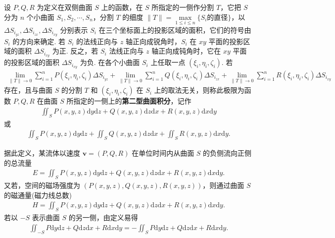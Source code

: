 \documentclass[../../main.tex]{subfiles}%
\begin{document}
\begin{definition}
设 $P, Q, R$ 为定义在双侧曲面 $S$ 上的函数，在 $S$ 所指定的一侧作分割 $T$，它把 $S$ 分为 $n$ 个小曲面 $S_1, S_2, \cdots, S_n$，分割 $T$ 的细度 $\|T\| = \max\limits_{1\leqslant i\leqslant n} \{S_i \text{的直径}\}$，以 $\Delta S_{i_{yz}}, \Delta S_{i_{zx}}, \Delta S_{i_{xy}}$ 分别表示 $S_i$ 在三个坐标面上的投影区域的面积，它们的符号由 $S_i$ 的方向来确定. 若 $S_i$ 的法线正向与 $z$ 轴正向成锐角时，$S_i$ 在 $xy$ 平面的投影区域的面积 $\Delta S_{i_{xy}}$ 为正. 反之，若 $S_i$ 法线正向与 $z$ 轴正向成钝角时，它在 $xy$ 平面的投影区域的面积 $\Delta S_{i_{xy}}$ 为负. 在各个小曲面 $S_i$ 上任取一点 $(\xi_i, \eta_i, \zeta_i)$. 若
\begin{align*}
\lim\limits_{\|T\|\to 0} \sum\limits_{i=1}^n P(\xi_i, \eta_i, \zeta_i) \Delta S_{i_{yz}} + \lim\limits_{\|T\|\to 0} \sum\limits_{i=1}^n Q(\xi_i, \eta_i, \zeta_i) \Delta S_{i_{zx}} + \lim\limits_{\|T\|\to 0} \sum\limits_{i=1}^n R(\xi_i, \eta_i, \zeta_i) \Delta S_{i_{xy}}
\end{align*}
存在，且与曲面 $S$ 的分割 $T$ 和 $(\xi_i, \eta_i, \zeta_i)$ 在 $S_i$ 上的取法无关，则称此极限为函数 $P, Q, R$ 在曲面 $S$ 所指定的一侧上的\textbf{第二型曲面积分}，记作
\begin{align*}
\iint_S P(x,y,z) \mathrm{d}y\mathrm{d}z + Q(x,y,z) \mathrm{d}z\mathrm{d}x + R(x,y,z) \mathrm{d}x\mathrm{d}y
\end{align*}
或
\begin{align*}
\iint_S P(x,y,z) \mathrm{d}y\mathrm{d}z + \iint_S Q(x,y,z) \mathrm{d}z\mathrm{d}x + \iint_S R(x,y,z) \mathrm{d}x\mathrm{d}y.
\end{align*}
\end{definition}
\begin{remark}
据此定义，某流体以速度 $\bm{v} = (P, Q, R)$ 在单位时间内从曲面 $S$ 的负侧流向正侧的总流量
\begin{align*}
E = \iint_S P(x,y,z) \mathrm{d}y\mathrm{d}z + Q(x,y,z) \mathrm{d}z\mathrm{d}x + R(x,y,z) \mathrm{d}x\mathrm{d}y.
\end{align*}
又若，空间的磁场强度为 $(P(x,y,z), Q(x,y,z), R(x,y,z))$，则通过曲面 $S$ 的磁通量(磁力线总数)
\begin{align*}
H = \iint_S P(x,y,z) \mathrm{d}y\mathrm{d}z + Q(x,y,z) \mathrm{d}z\mathrm{d}x + R(x,y,z) \mathrm{d}x\mathrm{d}y.
\end{align*}
若以 $-S$ 表示曲面 $S$ 的另一侧，由定义易得
\begin{align*}
\iint_{-S} P \mathrm{d}y\mathrm{d}z + Q \mathrm{d}z\mathrm{d}x + R \mathrm{d}x\mathrm{d}y = -\iint_S P \mathrm{d}y\mathrm{d}z + Q \mathrm{d}z\mathrm{d}x + R \mathrm{d}x\mathrm{d}y.
\end{align*}
\end{remark}
\end{document}
